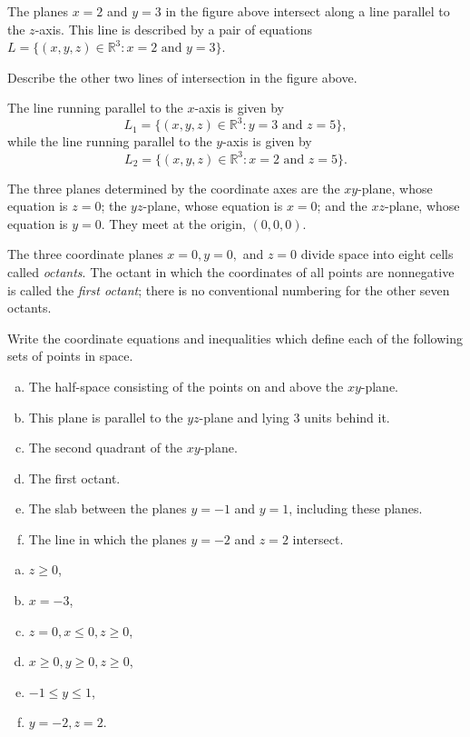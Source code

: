\documentclass[12pt,letterpaper,reqno]{article}
\numberwithin{equation}{section}
\newcommand{\ti}[1]{\textit{#1}}
\begin{document}
The planes $x=2$ and $y=3$ in the figure above intersect along a line parallel to the $z$-axis. This line is described by a pair of equations $L=\{(x,y,z) \in \mathbb{R}^3: x=2 \text{ and } y=3\}$.

\begin{exercise}
	Describe the other two lines of intersection in the figure above.
\end{exercise}

{\color{red} 
The line running parallel to the $x$-axis is given by $$L_1=\{(x,y,z) \in \mathbb{R}^3: y=3 \text{ and } z=5\},$$ while the line running parallel to the $y$-axis is given by $$L_2=\{(x,y,z) \in \mathbb{R}^3: x=2 \text{ and } z=5\}.$$}

The three planes determined by the coordinate axes are the $xy$-plane, whose equation is $z=0$; the $yz$-plane, whose equation is $x=0$; and the $xz$-plane, whose equation is $y=0$. They meet at the origin, $(0,0,0)$.
	
The three coordinate planes $x=0, y=0,$ and $z=0$ divide space into eight cells called \ti{octants}. The octant in which the coordinates of all points are nonnegative is called the \ti{first octant}; there is no conventional numbering for the other seven octants.

\begin{exercise}
Write the coordinate equations and inequalities which define each of the following sets of points in space.
\begin{enumerate}[(a)]
	\item The half-space consisting of the points on and above the $xy$-plane.
	\item  This plane is parallel to the $yz$-plane and lying 3 units behind it.
	\item The second quadrant of the $xy$-plane.
	\item The first octant.
	\item The slab between the planes $y=-1$ and $y=1$, including these planes.
	\item The line in which the planes $y=-2$ and $z=2$ intersect.
\end{enumerate}	
\end{exercise}

{\color{red}  
\begin{enumerate}[(a)]
	\item $z \geq 0$,
	\item $x=-3$,
	\item $z=0, x \leq 0, z \geq 0$,
	\item $x \geq 0, y \geq 0, z \geq 0$,
	\item $-1 \leq y \leq 1$,
	\item $y=-2,z=2$.
\end{enumerate}}
\end{document}
